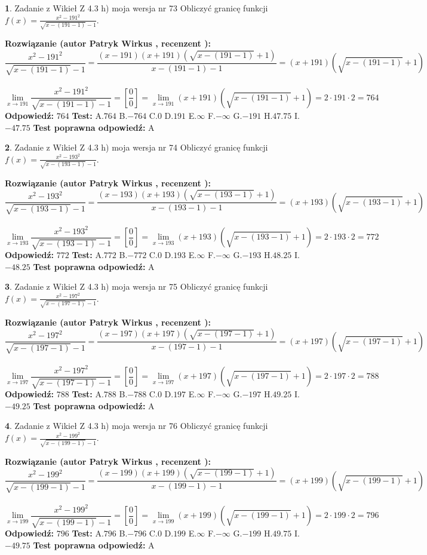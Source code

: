 \documentclass[12pt, a4paper]{article}
\theoremstyle{definition} %
\newtheorem{zad}{}
\newcommand{\zadStart}[1]{\begin{zad}#1\newline}
\newcommand{\zadStop}{\end{zad}}
\newcommand{\rozwStart}[2]{\noindent \textbf{Rozwiązanie (autor #1 , recenzent #2): }\newline}
\newcommand{\rozwStop}{\newline}
\newcommand{\odpStart}{\noindent \textbf{Odpowiedź:}\newline}
\newcommand{\odpStop}{\newline}
\newcommand{\testStart}{\noindent \textbf{Test:}\newline}
\newcommand{\testStop}{\newline}
\newcommand{\kluczStart}{\noindent \textbf{Test poprawna odpowiedź:}\newline}
\newcommand{\kluczStop}{\newline}
\begin{document}
\zadStart{Zadanie z Wikieł Z 4.3 h) moja wersja nr 73}
Obliczyć granicę funkcji $f(x)=\frac{x^{2} - 191^{2}}{\sqrt{x-(191-1)}-1}$.
\zadStop
\rozwStart{Patryk Wirkus}{}
$$\frac{x^{2} - 191^{2}}{\sqrt{x-(191-1)}-1}=\frac{(x-191)(x+191)(\sqrt{x-(191-1)}+1)}{x-(191-1)-1}=(x+191)(\sqrt{x-(191-1)}+1)$$
\\
$$\lim\limits_{x\to 191}\frac{x^{2} - 191^{2}}{\sqrt{x-(191-1)}-1}=[\frac{0}{0}]=
\lim\limits_{x\to 191}(x+191)(\sqrt{x-(191-1)}+1) = 2\cdot191 \cdot 2 = 764$$
\rozwStop
\odpStart
$764$
\odpStop
\testStart
A.$764$
B.$-764$
C.$0$
D.$191$
E.$\infty$
F.$-\infty$
G.$-191$
H.$47.75$
I.$-47.75$
\testStop
\kluczStart
A
\kluczStop



\zadStart{Zadanie z Wikieł Z 4.3 h) moja wersja nr 74}
Obliczyć granicę funkcji $f(x)=\frac{x^{2} - 193^{2}}{\sqrt{x-(193-1)}-1}$.
\zadStop
\rozwStart{Patryk Wirkus}{}
$$\frac{x^{2} - 193^{2}}{\sqrt{x-(193-1)}-1}=\frac{(x-193)(x+193)(\sqrt{x-(193-1)}+1)}{x-(193-1)-1}=(x+193)(\sqrt{x-(193-1)}+1)$$
\\
$$\lim\limits_{x\to 193}\frac{x^{2} - 193^{2}}{\sqrt{x-(193-1)}-1}=[\frac{0}{0}]=
\lim\limits_{x\to 193}(x+193)(\sqrt{x-(193-1)}+1) = 2\cdot193 \cdot 2 = 772$$
\rozwStop
\odpStart
$772$
\odpStop
\testStart
A.$772$
B.$-772$
C.$0$
D.$193$
E.$\infty$
F.$-\infty$
G.$-193$
H.$48.25$
I.$-48.25$
\testStop
\kluczStart
A
\kluczStop



\zadStart{Zadanie z Wikieł Z 4.3 h) moja wersja nr 75}
Obliczyć granicę funkcji $f(x)=\frac{x^{2} - 197^{2}}{\sqrt{x-(197-1)}-1}$.
\zadStop
\rozwStart{Patryk Wirkus}{}
$$\frac{x^{2} - 197^{2}}{\sqrt{x-(197-1)}-1}=\frac{(x-197)(x+197)(\sqrt{x-(197-1)}+1)}{x-(197-1)-1}=(x+197)(\sqrt{x-(197-1)}+1)$$
\\
$$\lim\limits_{x\to 197}\frac{x^{2} - 197^{2}}{\sqrt{x-(197-1)}-1}=[\frac{0}{0}]=
\lim\limits_{x\to 197}(x+197)(\sqrt{x-(197-1)}+1) = 2\cdot197 \cdot 2 = 788$$
\rozwStop
\odpStart
$788$
\odpStop
\testStart
A.$788$
B.$-788$
C.$0$
D.$197$
E.$\infty$
F.$-\infty$
G.$-197$
H.$49.25$
I.$-49.25$
\testStop
\kluczStart
A
\kluczStop



\zadStart{Zadanie z Wikieł Z 4.3 h) moja wersja nr 76}
Obliczyć granicę funkcji $f(x)=\frac{x^{2} - 199^{2}}{\sqrt{x-(199-1)}-1}$.
\zadStop
\rozwStart{Patryk Wirkus}{}
$$\frac{x^{2} - 199^{2}}{\sqrt{x-(199-1)}-1}=\frac{(x-199)(x+199)(\sqrt{x-(199-1)}+1)}{x-(199-1)-1}=(x+199)(\sqrt{x-(199-1)}+1)$$
\\
$$\lim\limits_{x\to 199}\frac{x^{2} - 199^{2}}{\sqrt{x-(199-1)}-1}=[\frac{0}{0}]=
\lim\limits_{x\to 199}(x+199)(\sqrt{x-(199-1)}+1) = 2\cdot199 \cdot 2 = 796$$
\rozwStop
\odpStart
$796$
\odpStop
\testStart
A.$796$
B.$-796$
C.$0$
D.$199$
E.$\infty$
F.$-\infty$
G.$-199$
H.$49.75$
I.$-49.75$
\testStop
\kluczStart
A
\kluczStop
\end{document}

